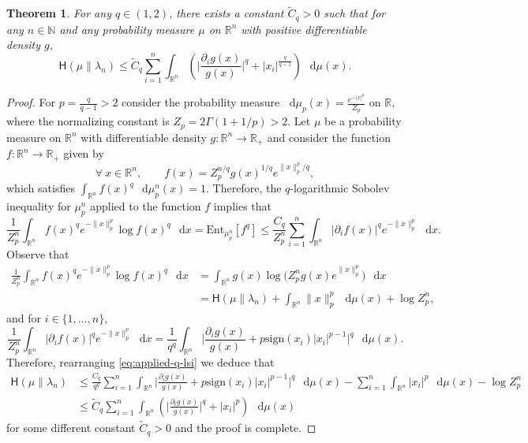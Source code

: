 \documentclass[a4paper,twoside,11pt,reqno]{amsart}
\newtheorem{theorem}{Theorem}
\newcommand*\diff{\mathop{}\!\mathrm{d}}
\newcommand{\R}{\mathbb{R}} %
\newcommand{\N}{\mathbb{N}}
\newcommand{\msf}{\mathsf}
\begin{document}
\begin{theorem}
For any $q\in(1,2)$, there exists a constant $\tilde{C}_q>0$  such that for any $n\in\N$ and any probability measure $\mu$ on $\R^n$ with positive differentiable density $g$,
\begin{equation} \label{eq:qlsi''}
\msf{H}(\mu \| \lambda_n) \leq \tilde{C}_q \sum_{i=1}^n \int_{\R^n} \left(\Big| \frac{\partial_i g(x)}{g(x)} \Big|^q + |x_i|^\frac{q}{q-1}\right) \,\diff\mu(x).
\end{equation}
\end{theorem}

\begin{proof}
For $p=\frac{q}{q-1}>2$ consider the probability measure $\diff\mu_p(x) = \tfrac{e^{-|x|^p}}{Z_p}$ on $\R$, where the normalizing constant is $Z_p = 2\Gamma(1+1/p)>2$.  Let $\mu$ be a probability measure on $\R^n$ with differentiable density $g:\R^n\to\R_+$ and consider the function $f:\R^n\to\R_+$ given by
\begin{equation}
\forall \ x\in\R^n,\qquad f(x)  = Z_p^{n/q} g(x)^{1/q} e^{\|x\|_p^p/q},
\end{equation}
which satisfies $\int_{\R^n} f(x)^q \,\diff\mu_p^n(x) = 1$. Therefore,  the $q$-logarithmic Sobolev inequality for $\mu_p^n$ applied to the function $f$ implies that
\begin{equation} \label{eq:applied-q-lsi}
\frac{1}{Z_p^n} \int_{\R^n} f(x)^q e^{-\|x\|_p^p} \log f(x)^q \,\diff x = \mathrm{Ent}_{\mu_p^n} [f^q] \leq \frac{C_q}{Z_p^n} \sum_{i=1}^n \int_{\R^n} |\partial_i f(x)|^q e^{-\|x\|_p^p} \, \diff x.
\end{equation}
Observe that
\begin{equation}
\begin{split}
\frac{1}{Z_p^n} \int_{\R^n}  f(x)^q e^{-\|x\|_p^p} \log f(x)^q \,\diff x & = \int_{\R^n} g(x) \log\big(Z_p^n g(x) e^{\|x\|_p^p}\big)\,\diff x
\\ & = \msf{H}(\mu\|\lambda_n) + \int_{\R^n} \|x\|_p^p\,\diff\mu(x) + \log Z_p^n,
\end{split}
\end{equation}
and for $i\in\{1,\ldots,n\}$,
\begin{equation}
\frac{1}{Z_p^n} \int_{\R^n} |\partial_i f(x)|^q e^{-\|x\|_p^p} \,\diff x = \frac{1}{q^q} \int_{\R^n} \Big| \frac{\partial_i g(x)}{g(x)}+ p \mathrm{sign}(x_i)|x_i|^{p-1}\Big|^q \,\diff\mu(x).
\end{equation}
Therefore, rearranging \eqref{eq:applied-q-lsi} we deduce that
\begin{equation}
\begin{split}
\msf{H}(\mu\|\lambda_n) & \leq \frac{C_q}{q^q} \sum_{i=1}^n\int_{\R^n} \Big| \frac{\partial_i g(x)}{g(x)}+ p \mathrm{sign}(x_i)|x_i|^{p-1}\Big|^q \,\diff\mu(x) - \sum_{i=1}^n \int_{\R^n} |x_i|^p\,\diff\mu(x) - \log Z_p^n \\ & \leq \tilde{C}_q \sum_{i=1}^n \int_{\R^n} \left(\Big| \frac{\partial_i g(x)}{g(x)} \Big|^q + |x_i|^p\right) \,\diff\mu(x) 
\end{split}
\end{equation}
for some different constant $\tilde{C}_q>0$ and the proof is complete.
\end{proof}
\end{document}
